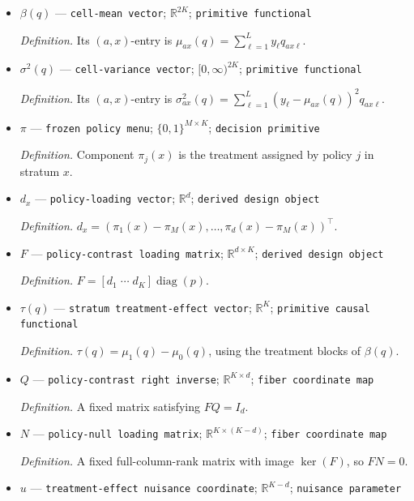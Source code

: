 \documentclass{article}
\begin{document}
\begin{itemize}
  \item \(\beta(q)\) --- \texttt{cell-\allowbreak{}mean vector}; \(\mathbb R^{2K}\); \texttt{primitive functional}
  \par\smallskip\noindent\emph{Definition.} Its \((a,x)\)-entry is \(\mu_{ax}(q)=\sum_{\ell=1}^{L}y_\ell q_{ax\ell}\).
  \item \(\sigma^2(q)\) --- \texttt{cell-\allowbreak{}variance vector}; \([0,\infty)^{2K}\); \texttt{primitive functional}
  \par\smallskip\noindent\emph{Definition.} Its \((a,x)\)-entry is \(\sigma^2_{ax}(q)=\sum_{\ell=1}^{L}(y_\ell-\mu_{ax}(q))^2q_{ax\ell}\).
  \item \(\pi\) --- \texttt{frozen policy menu}; \(\{0,1\}^{M\times K}\); \texttt{decision primitive}
  \par\smallskip\noindent\emph{Definition.} Component \(\pi_j(x)\) is the treatment assigned by policy \(j\) in stratum \(x\).
  \item \(d_x\) --- \texttt{policy-\allowbreak{}loading vector}; \(\mathbb R^d\); \texttt{derived design object}
  \par\smallskip\noindent\emph{Definition.} \(d_x=(\pi_1(x)-\pi_M(x),\ldots,\pi_d(x)-\pi_M(x))^\top\).
  \item \(F\) --- \texttt{policy-\allowbreak{}contrast loading matrix}; \(\mathbb R^{d\times K}\); \texttt{derived design object}
  \par\smallskip\noindent\emph{Definition.} \(F=[d_1\;\cdots\;d_K]\operatorname{diag}(p)\).
  \item \(\tau(q)\) --- \texttt{stratum treatment-\allowbreak{}effect vector}; \(\mathbb R^K\); \texttt{primitive causal functional}
  \par\smallskip\noindent\emph{Definition.} \(\tau(q)=\mu_1(q)-\mu_0(q)\), using the treatment blocks of \(\beta(q)\).
  \item \(Q\) --- \texttt{policy-\allowbreak{}contrast right inverse}; \(\mathbb R^{K\times d}\); \texttt{fiber coordinate map}
  \par\smallskip\noindent\emph{Definition.} A fixed matrix satisfying \(FQ=I_d\).
  \item \(N\) --- \texttt{policy-\allowbreak{}null loading matrix}; \(\mathbb R^{K\times(K-d)}\); \texttt{fiber coordinate map}
  \par\smallskip\noindent\emph{Definition.} A fixed full-column-rank matrix with image \(\ker(F)\), so \(FN=0\).
  \item \(u\) --- \texttt{treatment-\allowbreak{}effect nuisance coordinate}; \(\mathbb R^{K-d}\); \texttt{nuisance parameter}

\end{itemize}
\end{document}
